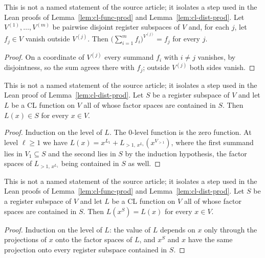 \begin{lemma}\label{lem:cl-restriction-sum}
	\leanok
	This is not a named statement of the source article; it isolates a step used in the Lean proofs of Lemma~\ref{lem:cl-func-prod} and Lemma~\ref{lem:cl-dist-prod}. Let $V^{(1)}, \dots, V^{(m)}$ be pairwise disjoint register subspaces of $V$ and, for each $j$, let $f_j \in V$ vanish outside $V^{(j)}$. Then $\bigl( \sum_{i=1}^m f_i \bigr)^{V^{(j)}} = f_j$ for every $j$.
\end{lemma}
\begin{proof}
	\leanok
	On a coordinate of $V^{(j)}$ every summand $f_i$ with $i \neq j$ vanishes, by disjointness, so the sum agrees there with $f_j$; outside $V^{(j)}$ both sides vanish.
\end{proof}

\begin{lemma}\label{lem:cl-supported-vanishing}
	\leanok
	This is not a named statement of the source article; it isolates a step used in the Lean proof of Lemma~\ref{lem:cl-dist-prod}. Let $S$ be a register subspace of $V$ and let $L$ be a CL function on $V$ all of whose factor spaces are contained in $S$. Then $L(x) \in S$ for every $x \in V$.
\end{lemma}
\begin{proof}
	\leanok
	Induction on the level of $L$. The $0$-level function is the zero function. At level $\ell \ge 1$ we have $L(x) = x^{L_1} + L_{>1,\,x^{L_1}}(x^{V_{>1}})$, where the first summand lies in $V_1 \subseteq S$ and the second lies in $S$ by the induction hypothesis, the factor spaces of $L_{>1,\,x^{L_1}}$ being contained in $S$ as well.
\end{proof}

\begin{lemma}\label{lem:cl-supported-restriction}
	\leanok
	This is not a named statement of the source article; it isolates a step used in the Lean proofs of Lemma~\ref{lem:cl-func-prod} and Lemma~\ref{lem:cl-dist-prod}. Let $S$ be a register subspace of $V$ and let $L$ be a CL function on $V$ all of whose factor spaces are contained in $S$. Then $L(x^S) = L(x)$ for every $x \in V$.
\end{lemma}
\begin{proof}
	\leanok
	Induction on the level of $L$: the value of $L$ depends on $x$ only through the projections of $x$ onto the factor spaces of $L$, and $x^S$ and $x$ have the same projection onto every register subspace contained in $S$.
\end{proof}

